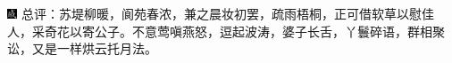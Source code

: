 {\includegraphics[width=3mm]{../Images/00005}  \kaishu 总评：苏堤柳暖，阆苑春浓，兼之晨妆初罢，疏雨梧桐，正可借软草以慰佳人，采奇花以寄公子。不意莺嗔燕怒，逗起波涛，婆子长舌，丫鬟碎语，群相聚讼，又是一样烘云托月法。}



